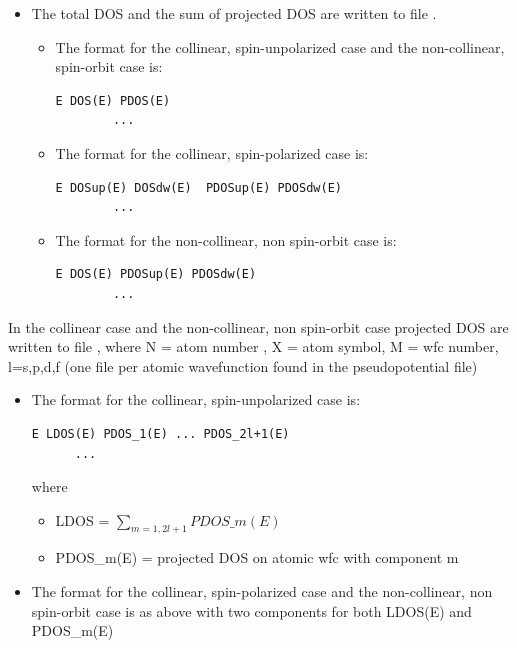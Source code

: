 \documentclass[landscape]{foils}
\begin{document}
\begin{itemize}
  \item The total DOS and the sum of projected DOS are written to file
  .
  \begin{itemize}
    \item The format for the collinear, spin-unpolarized case and the
    non-collinear, spin-orbit case is:
    \vspace{0.5em}
    \begin{Verbatim}[frame=single,fontsize=\small]
        E DOS(E) PDOS(E)
        ...
    \end{Verbatim}
  
    \item The format for the collinear, spin-polarized case is:
      \vspace{0.5em}
      \begin{Verbatim}[frame=single,fontsize=\small]
        E DOSup(E) DOSdw(E)  PDOSup(E) PDOSdw(E)
        ...
      \end{Verbatim}
    \item The format for the non-collinear, non spin-orbit case is:
      \vspace{0.5em}
      \begin{Verbatim}[frame=single,fontsize=\small]
        E DOS(E) PDOSup(E) PDOSdw(E)
        ...
      \end{Verbatim}

    \end{itemize}
  \end{itemize}
  {\small
  In the collinear case and the non-collinear, non spin-orbit case
  projected DOS are written to file ,
  where N = atom number , X = atom symbol, M = wfc number, l=s,p,d,f
  (one file per atomic wavefunction found in the pseudopotential file)
  }
  \begin{itemize}
    \item The format for the collinear, spin-unpolarized case is:
    \vspace{0.5em}
      \begin{Verbatim}[frame=single,fontsize=\small]
      E LDOS(E) PDOS_1(E) ... PDOS_2l+1(E)
      ...
      \end{Verbatim}

  where 
  \begin{itemize}
    \item LDOS = $\sum_{m=1,2l+1} {PDOS\_{m(E)}}$
    \item PDOS\_m(E) = projected DOS on atomic wfc with component m
  \end{itemize}

\item  The format for the collinear, spin-polarized case and the
  non-collinear, non spin-orbit case is as above with
  two components for both  LDOS(E) and PDOS\_m(E)
  \end{itemize}
\end{document}
